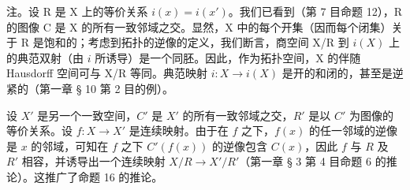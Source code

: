 注。设 R 是 X 上的等价关系 \(i(x) = i(x')\)。我们已看到（第 7 目命题 12），R 的图像 C 是 X 的所有一致邻域之交。显然，X 中的每个开集（因而每个闭集）关于 R 是饱和的；考虑到拓扑的逆像的定义，我们断言，商空间 X/R 到 \(i(X)\) 上的典范双射（由 \(i\) 所诱导）是一个同胚。因此，作为拓扑空间，X 的伴随 Hausdorff 空间可与 X/R 等同。典范映射 \(i: X \to i(X)\) 是开的和闭的，甚至是逆紧的（第一章 § 10 第 2 目的例）。

设 \(X'\) 是另一个一致空间，\(C'\) 是 \(X'\) 的所有一致邻域之交，\(R'\) 是以 \(C'\) 为图像的等价关系。设 \(f: X \to X'\) 是连续映射。由于在 \(f\) 之下，\(f(x)\) 的任一邻域的逆像是 \(x\) 的邻域，可知在 \(f\) 之下 \(C'(f(x))\) 的逆像包含 \(C(x)\)，因此 \(f\) 与 \(R\) 及 \(R'\) 相容，并诱导出一个连续映射 \(X/R \to X'/R'\)（第一章 § 3 第 4 目命题 6 的推论）。这推广了命题 16 的推论。

